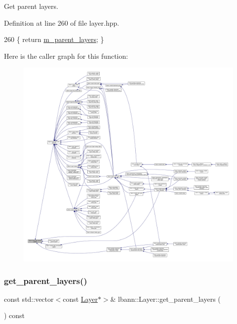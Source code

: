 Get parent layers. 

Definition at line 260 of file layer.\+hpp.


\begin{DoxyCode}
260 \{ \textcolor{keywordflow}{return} \hyperlink{classlbann_1_1Layer_a3fa7c6cf1a22bb14ab0e85e3dc6027c5}{m\_parent\_layers}; \}
\end{DoxyCode}
Here is the caller graph for this function\+:\nopagebreak
\begin{figure}[H]
\begin{center}
\leavevmode
\includegraphics[width=350pt]{classlbann_1_1Layer_a898e72b93752abf52d35b06459cd360e_icgraph}
\end{center}
\end{figure}
\mbox{\label{classlbann_1_1Layer_a233ceaf4e6c6b5c24dd097ffff511579}} 
\subsubsection{\texorpdfstring{get\+\_\+parent\+\_\+layers()}{get\_parent\_layers()}\hspace{0.1cm}{\footnotesize\ttfamily [2/2]}}
{\footnotesize\ttfamily const std\+::vector$<$const \hyperlink{classlbann_1_1Layer}{Layer}$\ast$$>$\& lbann\+::\+Layer\+::get\+\_\+parent\+\_\+layers (\begin{DoxyParamCaption}{ }\end{DoxyParamCaption}) const\hspace{0.3cm}{\ttfamily [inline]}}

